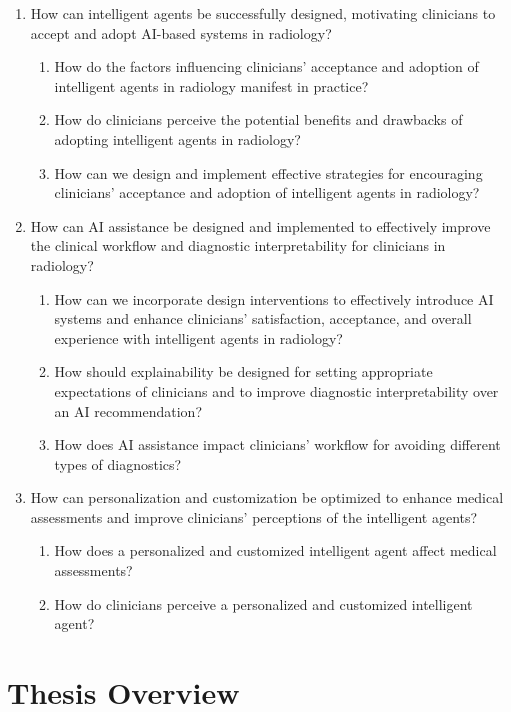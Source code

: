 \begin{enumerate}
\item How can intelligent agents be successfully designed, motivating clinicians to accept and adopt \ac{AI}-based systems in radiology?
\begin{enumerate}
\item How do the factors influencing clinicians' acceptance and adoption of intelligent agents in radiology manifest in practice?
\item How do clinicians perceive the potential benefits and drawbacks of adopting intelligent agents in radiology?
\item How can we design and implement effective strategies for encouraging clinicians' acceptance and adoption of intelligent agents in radiology?
\end{enumerate}
\item How can \ac{AI} assistance be designed and implemented to effectively improve the clinical workflow and diagnostic interpretability for clinicians in radiology?
\begin{enumerate}
\item How can we incorporate design interventions to effectively introduce \ac{AI} systems and enhance clinicians' satisfaction, acceptance, and overall experience with intelligent agents in radiology?
\item How should explainability be designed for setting appropriate expectations of clinicians and to improve diagnostic interpretability over an AI recommendation?
\item How does AI assistance impact clinicians' workflow for avoiding different types of diagnostics?
\end{enumerate}
\item How can personalization and customization be optimized to enhance medical assessments and improve clinicians' perceptions of the intelligent agents?
\begin{enumerate}
\item How does a personalized and customized intelligent agent affect medical assessments?
\item How do clinicians perceive a personalized and customized intelligent agent?
\end{enumerate}
\end{enumerate}

\section{Thesis Overview}
\label{sec:chap001004}

